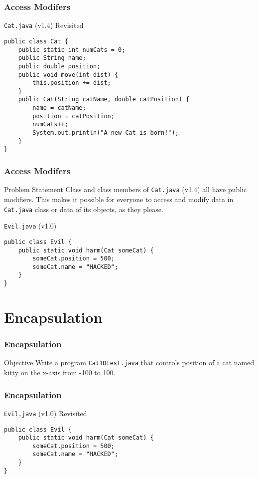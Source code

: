 \documentclass[10pt, compress]{beamer}
\begin{document}
\begin{frame}[fragile]
	\frametitle{Access Modifers}
	\begin{block}{\texttt{Cat.java} (v1.4) Revisited}
		\begin{verbatim}
public class Cat {
	public static int numCats = 0;
	public String name;
	public double position;
	public void move(int dist) {
		this.position += dist;
	}
	public Cat(String catName, double catPosition) {
		name = catName;
		position = catPosition;
		numCats++;
		System.out.println("A new Cat is born!");
	}
}
		\end{verbatim}
	\end{block}
\end{frame}

\begin{frame}[fragile]
	\frametitle{Access Modifers}
	\begin{block}{Problem Statement}
		Class and class members of \texttt{Cat.java} (v1.4) all have public modifiers. This makes it possible for everyone to access and modify data in \texttt{Cat.java} class or data of its objects, as they please.
	\end{block}
	\begin{block}{\texttt{Evil.java} (v1.0)}
		\begin{verbatim}
public class Evil {
	public static void harm(Cat someCat) {
		someCat.position = 500;
		someCat.name = "HACKED";
	}
}
		\end{verbatim}
	\end{block}
\end{frame}

\section{Encapsulation}

\begin{frame}[fragile]
	\frametitle{Encapsulation}
	\begin{block}{Objective}
		Write a program \texttt{Cat1Dtest.java} that controls position of a cat named kitty on the x-axis from -100 to 100.
	\end{block}
\end{frame}

\begin{frame}[fragile]
	\frametitle{Encapsulation}
	\begin{block}{\texttt{Evil.java} (v1.0) Revisited}
		\begin{verbatim}
public class Evil {
	public static void harm(Cat someCat) {
		someCat.position = 500;
		someCat.name = "HACKED";
	}
}
		\end{verbatim}
	\end{block}
\end{frame}
\end{document}
